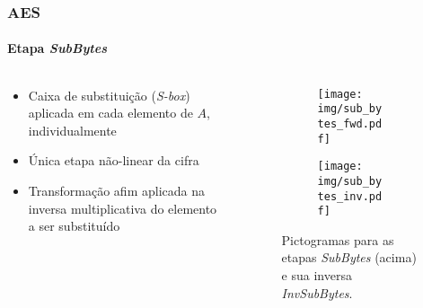 \documentclass[12pt]{beamer}
\begin{document}
\begin{frame}
    \frametitle{AES}
    \framesubtitle{Etapa \emph{SubBytes}}
    \begin{columns}[T]
        \begin{column}{.7\textwidth}
          \begin{itemize}
            \item Caixa de substituição (\emph{S-box}) aplicada em cada elemento de $A$, individualmente
            \item Única etapa não-linear da cifra
            \item Transformação afim aplicada na inversa multiplicativa do elemento a ser substituído
          \end{itemize}
        \end{column}
        \begin{column}{.25\textwidth}
            \begin{figure}
            \centering
            \begin{subfigure}[b]{0.7\textwidth}
               \texttt{[image: img/sub\_bytes\_fwd.pdf]}
               \vspace{2mm}
            \end{subfigure}
            
            \begin{subfigure}[b]{0.7\textwidth}
               \texttt{[image: img/sub\_bytes\_inv.pdf]}
            \end{subfigure}
                    \captionsetup{font=scriptsize}
        
            \caption*{Pictogramas para as etapas \emph{SubBytes} (acima) e sua inversa \emph{InvSubBytes}.}
            \end{figure}
        \end{column}
    \end{columns}
\end{frame}
\end{document}
